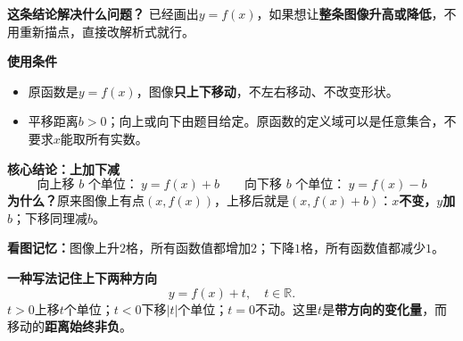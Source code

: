 \begin{statementbox}
  \textbf{\textcolor{CStatement}{这条结论解决什么问题？}}
  已经画出$y=f(x)$，如果想让\textbf{整条图像升高或降低}，不用重新描点，直接改解析式就行。

  \medskip
  \textbf{\textcolor{CStatement}{使用条件}}
  \begin{itemize}[leftmargin=*,itemsep=0.25em,topsep=0.25em]
    \item 原函数是$y=f(x)$，图像\textbf{只上下移动}，不左右移动、不改变形状。
    \item 平移距离$b>0$；向上或向下由题目给定。原函数的定义域可以是任意集合，不要求$x$能取所有实数。
  \end{itemize}

  \textbf{\textcolor{CStatement}{核心结论：上加下减}}
  \[
    \boxed{\text{向上移 }b\text{ 个单位：}\ y=f(x)+b}
    \qquad
    \boxed{\text{向下移 }b\text{ 个单位：}\ y=f(x)-b}
  \]
  \textbf{为什么？}原来图像上有点$(x,f(x))$，上移后就是$(x,f(x)+b)$：\textbf{$x$不变，$y$加$b$}；下移同理减$b$。

  \begin{center}
  
  \end{center}
  \textbf{看图记忆：}图像上升$2$格，所有函数值都增加$2$；下降$1$格，所有函数值都减少$1$。

  \medskip
  \textbf{\textcolor{CStatement}{一种写法记住上下两种方向}}
  \[
    y=f(x)+t,\quad t\in\mathbb R.
  \]
  $t>0$上移$t$个单位；$t<0$下移$|t|$个单位；$t=0$不动。这里$t$是\textbf{带方向的变化量}，而移动的\textbf{距离始终非负}。
\end{statementbox}
